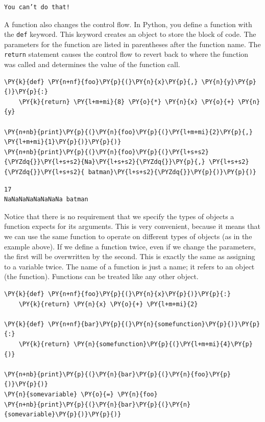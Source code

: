 \begin{Verbatim}
You can’t do that!

\end{Verbatim}


A function also changes the control flow.  In Python, you define a function with the \texttt{def} keyword.  This keyword creates an object to store the block of code.  The parameters for the function are listed in parentheses after the function name.  The \texttt{return} statement causes the control flow to revert back to where the function was called and determines the value of the function call.  


\begin{Verbatim}[commandchars=\\\{\}]
\PY{k}{def} \PY{n+nf}{foo}\PY{p}{(}\PY{n}{x}\PY{p}{,} \PY{n}{y}\PY{p}{)}\PY{p}{:}
    \PY{k}{return} \PY{l+m+mi}{8} \PY{o}{*} \PY{n}{x} \PY{o}{+} \PY{n}{y}

\PY{n+nb}{print}\PY{p}{(}\PY{n}{foo}\PY{p}{(}\PY{l+m+mi}{2}\PY{p}{,} \PY{l+m+mi}{1}\PY{p}{)}\PY{p}{)}
\PY{n+nb}{print}\PY{p}{(}\PY{n}{foo}\PY{p}{(}\PY{l+s+s2}{\PYZdq{}}\PY{l+s+s2}{Na}\PY{l+s+s2}{\PYZdq{}}\PY{p}{,} \PY{l+s+s2}{\PYZdq{}}\PY{l+s+s2}{ batman}\PY{l+s+s2}{\PYZdq{}}\PY{p}{)}\PY{p}{)}
\end{Verbatim}

\begin{Verbatim}
17
NaNaNaNaNaNaNaNa batman

\end{Verbatim}


Notice that there is no requirement that we specify the types of objects a function expects for its arguments.  This is very convenient, because it means that we can use the same function to operate on different types of objects (as in the example above).  If we define a function twice, even if we change the parameters, the first will be overwritten by the second.  This is exactly the same as assigning to a variable twice.  The name of a function is just a name; it refers to an object (the function).  Functions can be treated like any other object.


\begin{Verbatim}[commandchars=\\\{\}]
\PY{k}{def} \PY{n+nf}{foo}\PY{p}{(}\PY{n}{x}\PY{p}{)}\PY{p}{:}
    \PY{k}{return} \PY{n}{x} \PY{o}{+} \PY{l+m+mi}{2}

\PY{k}{def} \PY{n+nf}{bar}\PY{p}{(}\PY{n}{somefunction}\PY{p}{)}\PY{p}{:}
    \PY{k}{return} \PY{n}{somefunction}\PY{p}{(}\PY{l+m+mi}{4}\PY{p}{)}

\PY{n+nb}{print}\PY{p}{(}\PY{n}{bar}\PY{p}{(}\PY{n}{foo}\PY{p}{)}\PY{p}{)}
\PY{n}{somevariable} \PY{o}{=} \PY{n}{foo}
\PY{n+nb}{print}\PY{p}{(}\PY{n}{bar}\PY{p}{(}\PY{n}{somevariable}\PY{p}{)}\PY{p}{)}
\end{Verbatim}

